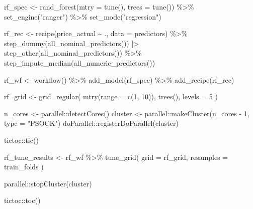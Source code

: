 \documentclass[
]{article}
\newenvironment{Shaded}{\begin{snugshade}}{\end{snugshade}}
\newcommand{\AttributeTok}[1]{\textcolor[rgb]{0.40,0.45,0.13}{#1}}
\newcommand{\DecValTok}[1]{\textcolor[rgb]{0.68,0.00,0.00}{#1}}
\newcommand{\FunctionTok}[1]{\textcolor[rgb]{0.28,0.35,0.67}{#1}}
\newcommand{\NormalTok}[1]{\textcolor[rgb]{0.00,0.23,0.31}{#1}}
\newcommand{\OtherTok}[1]{\textcolor[rgb]{0.00,0.23,0.31}{#1}}
\newcommand{\SpecialCharTok}[1]{\textcolor[rgb]{0.37,0.37,0.37}{#1}}
\newcommand{\StringTok}[1]{\textcolor[rgb]{0.13,0.47,0.30}{#1}}
\begin{document}
\begin{Shaded}
\begin{Highlighting}[]
\NormalTok{rf\_spec }\OtherTok{\textless{}{-}} \FunctionTok{rand\_forest}\NormalTok{(}\AttributeTok{mtry =} \FunctionTok{tune}\NormalTok{(), }\AttributeTok{trees =} \FunctionTok{tune}\NormalTok{()) }\SpecialCharTok{\%\textgreater{}\%}
  \FunctionTok{set\_engine}\NormalTok{(}\StringTok{"ranger"}\NormalTok{) }\SpecialCharTok{\%\textgreater{}\%}
  \FunctionTok{set\_mode}\NormalTok{(}\StringTok{"regression"}\NormalTok{)}

\NormalTok{rf\_rec }\OtherTok{\textless{}{-}} \FunctionTok{recipe}\NormalTok{(price\_actual }\SpecialCharTok{\textasciitilde{}}\NormalTok{ ., }\AttributeTok{data =}\NormalTok{ predictors) }\SpecialCharTok{\%\textgreater{}\%}
  \FunctionTok{step\_dummy}\NormalTok{(}\FunctionTok{all\_nominal\_predictors}\NormalTok{()) }\SpecialCharTok{|\textgreater{}}
  \FunctionTok{step\_other}\NormalTok{(}\FunctionTok{all\_nominal\_predictors}\NormalTok{()) }\SpecialCharTok{\%\textgreater{}\%}
  \FunctionTok{step\_impute\_median}\NormalTok{(}\FunctionTok{all\_numeric\_predictors}\NormalTok{())}

\NormalTok{rf\_wf }\OtherTok{\textless{}{-}} \FunctionTok{workflow}\NormalTok{() }\SpecialCharTok{\%\textgreater{}\%}
  \FunctionTok{add\_model}\NormalTok{(rf\_spec) }\SpecialCharTok{\%\textgreater{}\%}
  \FunctionTok{add\_recipe}\NormalTok{(rf\_rec)}

\NormalTok{rf\_grid }\OtherTok{\textless{}{-}} \FunctionTok{grid\_regular}\NormalTok{(}
  \FunctionTok{mtry}\NormalTok{(}\AttributeTok{range =} \FunctionTok{c}\NormalTok{(}\DecValTok{1}\NormalTok{, }\DecValTok{10}\NormalTok{)),}
  \FunctionTok{trees}\NormalTok{(),}
  \AttributeTok{levels =} \DecValTok{5}
\NormalTok{)}

\NormalTok{n\_cores }\OtherTok{\textless{}{-}}\NormalTok{ parallel}\SpecialCharTok{::}\FunctionTok{detectCores}\NormalTok{()}
\NormalTok{cluster }\OtherTok{\textless{}{-}}\NormalTok{ parallel}\SpecialCharTok{::}\FunctionTok{makeCluster}\NormalTok{(n\_cores }\SpecialCharTok{{-}} \DecValTok{1}\NormalTok{, }\AttributeTok{type =} \StringTok{"PSOCK"}\NormalTok{)}
\NormalTok{doParallel}\SpecialCharTok{::}\FunctionTok{registerDoParallel}\NormalTok{(cluster)}

\NormalTok{tictoc}\SpecialCharTok{::}\FunctionTok{tic}\NormalTok{()}

\NormalTok{rf\_tune\_results }\OtherTok{\textless{}{-}}\NormalTok{ rf\_wf }\SpecialCharTok{\%\textgreater{}\%}
  \FunctionTok{tune\_grid}\NormalTok{(}
    \AttributeTok{grid =}\NormalTok{ rf\_grid,}
    \AttributeTok{resamples =}\NormalTok{ train\_folds}
\NormalTok{  )}

\NormalTok{parallel}\SpecialCharTok{::}\FunctionTok{stopCluster}\NormalTok{(cluster)}

\NormalTok{tictoc}\SpecialCharTok{::}\FunctionTok{toc}\NormalTok{()}
\end{Highlighting}
\end{Shaded}
\end{document}
